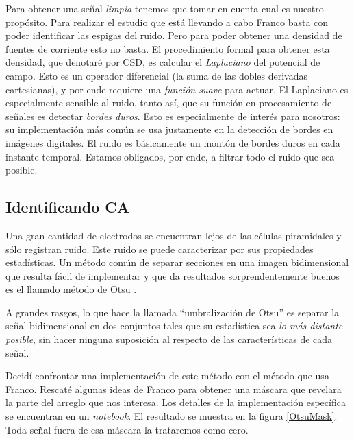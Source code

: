 \documentclass{article}
\begin{document}
Para obtener una señal \emph{limpia} tenemos que tomar en cuenta
cual es nuestro propósito. Para realizar el estudio que está llevando a cabo
Franco basta con poder identificar las espigas del ruido.
Pero para poder obtener una densidad de fuentes de corriente esto no basta.
El procedimiento formal para obtener esta densidad, que denotaré
 por CSD, es calcular el \emph{Laplaciano} del potencial de
campo. Esto es un operador diferencial (la suma de las dobles derivadas 
cartesianas), y por ende requiere una \emph{función suave} para actuar. 
El Laplaciano es especialmente sensible al ruido, tanto así, que su
función en procesamiento de señales es detectar \emph{bordes duros}.
Esto es especialmente de interés para nosotros: su implementación
más común  se usa
justamente en la detección de bordes en imágenes  digitales.
El ruido es básicamente un montón de bordes duros en cada instante temporal.
Estamos obligados, por ende, a filtrar todo el ruido que sea posible.


\subsection{Identificando CA}

Una gran cantidad de electrodos se encuentran lejos de las células
piramidales y sólo registran ruido. Este ruido se puede caracterizar
por sus propiedades estadísticas. Un método común de separar secciones
en una imagen bidimensional que resulta fácil de implementar y que
da resultados sorprendentemente buenos es el llamado método de Otsu
\cite{Otsu79}.

A grandes rasgos, lo que hace la llamada ``umbralización de Otsu'' es
separar la señal bidimensional en dos conjuntos tales que su 
estadística sea \emph{lo más distante posible}, sin hacer ninguna
suposición al respecto de las características de cada señal.

Decidí confrontar una implementación de este método con
el método que usa Franco.
Rescaté algunas ideas de Franco para obtener una máscara que
revelara la parte del arreglo que nos interesa.
Los detalles de la implementación específica 
se encuentran en un \emph{notebook}. El resultado se muestra en la figura
\ref{OtsuMask}.  Toda señal fuera de esa máscara la trataremos como cero.
\end{document}
